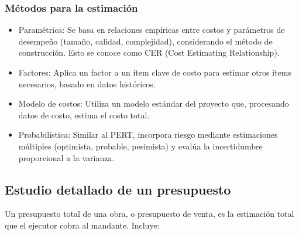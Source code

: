 \subsubsection{Métodos para la estimación}

\begin{itemize}
    \item Paramétrica: Se basa en relaciones empíricas entre costos y parámetros de desempeño (tamaño, calidad, complejidad), considerando el método de construcción. Esto se conoce como CER (Cost Estimating Relationship).
    \item Factores: Aplica un factor a un ítem clave de costo para estimar otros ítems necesarios, basado en datos históricos.
    \item Modelo de costos: Utiliza un modelo estándar del proyecto que, procesando datos de costo, estima el costo total.
    \item Probabilística: Similar al PERT, incorpora riesgo mediante estimaciones múltiples (optimista, probable, pesimista) y evalúa la incertidumbre proporcional a la varianza.
\end{itemize}

\subsection{Estudio detallado de un presupuesto}

Un presupuesto total de una obra, o presupuesto de venta, es la estimación total que el ejecutor cobra al mandante. Incluye:

